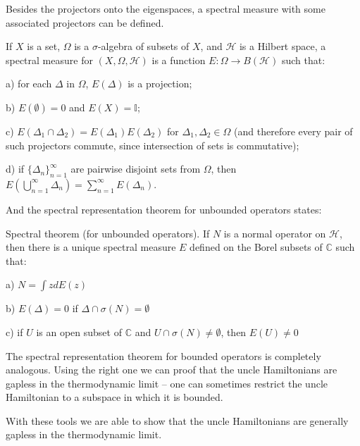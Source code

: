 \documentclass[cmp]{svjour}
\newcommand{\C}{\mathbb{C}}
\newcommand{\I}{\mathbb{I}}
\begin{document}
Besides the projectors onto the eigenspaces, a spectral measure with some associated projectors can be defined.


\begin{definition} \cite{conway}
    If $X$ is a set, $\Omega$ is a $\sigma$-algebra of subsets of $X$, and $\mathcal{H}$ is a Hilbert space, a spectral measure for $(X,\Omega,\mathcal{H})$ is a function $E:\Omega\to B(\mathcal{H})$ such that:

    a) for each $\Delta$ in $\Omega$, $E(\Delta)$ is a projection;

    b) $E(\emptyset)=0$ and $E(X)=\I$;

    c) $E(\Delta_1\cap\Delta_2)=E(\Delta_1)E(\Delta_2)$ for $\Delta_1,\Delta_2\in\Omega$ (and therefore every pair of such projectors commute, since intersection of sets is commutative);

    d) if $\{\Delta_n\}_{n=1}^\infty$ are pairwise disjoint sets from $\Omega$, then $E(\bigcup_{n=1}^\infty \Delta_n)=\sum_{n=1}^\infty E(\Delta_n)$.

\end{definition}

And the spectral representation theorem for unbounded operators states:

\begin{theorem} \cite{conway} Spectral theorem (for unbounded operators). If $N$ is a normal operator on $\mathcal{H}$, then there is a unique spectral measure $E$ defined on the Borel subsets of $\C$ such that:

    a) $N=\int zdE(z)$

    b) $E(\Delta)=0$ if $\Delta\cap\sigma(N)=\emptyset$

    c) if $U$ is an open subset of $\C$ and $U\cap\sigma(N)\ne\emptyset$, then $E(U)\ne 0$

\end{theorem}


The spectral representation theorem for bounded operators is completely analogous. Using the right one we can proof that the uncle Hamiltonians are gapless in the thermodynamic limit -- one can sometimes restrict the uncle Hamiltonian to a subspace in which it is bounded.

With these tools we are able to show that the uncle Hamiltonians are generally gapless in the thermodynamic limit.
\bigskip
\end{document}
